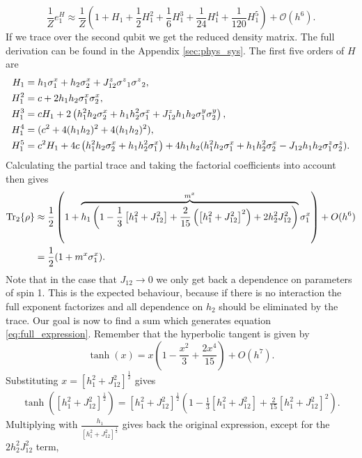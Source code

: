 \begin{equation*}
    \frac{1}{Z}e^H_1 \approx \frac{1}{Z} \left(1 + H_1 + \frac{1}{2}H_1^2 + \frac{1}{6} H_1^3 + \frac{1}{24} H_1^4+ \frac{1}{120} H_1^5\right) + \mathcal{O}(h^6).
\end{equation*}
If we trace over the second qubit we get the reduced density matrix. The full derivation can be found in the Appendix \ref{sec:phys_sys}. The first five orders of $H$ are
\begin{align*}
    H_1 &= h_1 {\sigma^{x}_1} + h_2 {\sigma^{x}_2} + J^{z}_{12} {\sigma^{z}}_1 {\sigma^{z}}_2,\\
    H_1^2 & = c + 2 h_1 h_2 {\sigma^{x}_1} {\sigma^{x}_2},\\
    H_1^3 &= c {H_1} + 2 \left(h_1^2 h_2 {\sigma^{x}_2} +  h_1h_2^2 {\sigma^{x}_1} + J_{12}^z h_1 h_2 {\sigma^{y}_1} {\sigma^{y}_2}\right),\\
    H_1^4 &= (c^2 + 4 (h_1 h_2)^2 + 4 (h_1 h_2)^2),\\
    H_1^5 &=  c^2 {H_1} + 4c \left(h_1^2 h_2 {\sigma^{x}_2} +  h_1h_2^2 {\sigma^{x}_1}\right) + 4 h_1 h_2(h_1^2 h_2 {\sigma^{x}_1} + h_1 h_2^2 {\sigma^{x}_2} - J_{12}h_1 h_2{\sigma^{z}_1}{\sigma^{z}_2}).
\end{align*}
Calculating the partial trace and taking the factorial coefficients into account then gives
\begin{align}
     \Tr_2\{\rho\}  &\approx   \frac{1}{2}\left(1 + \overbrace{h_1\left(1  - \frac{1}{3} \left[h_1^2 + J_{12}^2 \right]  + \frac{2}{15}\left(\left[h_1^2 + J_{12}^2\right]^2\right)+2h_2^2 J_{12}^2\right)}^{m^x}\sigma^{x}_1\right) + O(h^6)\label{eq:full_expression}\\
     & = \frac{1}{2}(1 + m^x\sigma^{x}_1)\nonumber.
\end{align}
Note that in the case that $J_{12}\to0$ we only get back a dependence on parameters of spin 1. This is the expected behaviour, because if there is no interaction the full exponent factorizes and all dependence on $h_2$ should be eliminated by the trace. Our goal is now to find a sum which generates equation \ref{eq:full_expression}. Remember that the hyperbolic tangent is given by
\begin{equation*}
    \tanh(x) = x\left(1 - \frac{x^2}{3} + \frac{2x^4}{15}\right)+ O(h^7).
\end{equation*}
Substituting $x= [h_1^2 + J_{12}^2]^\frac{1}{2}$ gives
\begin{align*}
    \tanh([h_1^2 + J_{12}^2]^\frac{1}{2}) = [h_1^2 + J_{12}^2]^\frac{1}{2}\left(1 - \frac{1}{3}[h_1^2 + J_{12}^2] + \frac{2}{15}[h_1^2 + J_{12}^2]^2\right).
\end{align*}
Multiplying with $\frac{h_1}{[h_1^2 + J_{12}^2]^\frac{1}{2}}$ gives back the original expression, except for the $2h_2^2 J_{12}^2$ term,
